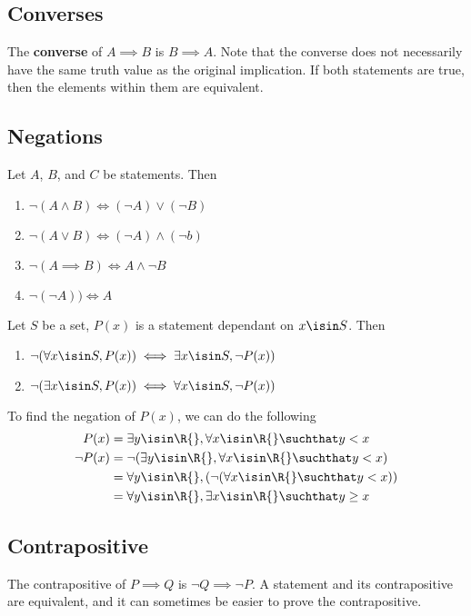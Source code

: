 \documentclass[12pt]{article}
\begin{document}
\subsection*{Converses}
The {\bf converse} of $A \implies B$ is $B \implies A$. Note that the converse does not necessarily have the same truth value as the original implication. If both statements are true, then the elements within them are equivalent.

\subsection*{Negations}
Let $A$, $B$, and $C$ be statements. Then
\begin{enumerate}
\item $\neg (A \land B) \iff (\neg A) \lor (\neg B)$
\item $\neg (A \lor B) \iff (\neg A) \land (\neg b)$
\item $\neg (A \implies B) \iff A \land \neg B$
\item $\neg (\neg A)) \iff A$
\end{enumerate}

Let $S$ be a set, $P(x)$ is a statement dependant on $x \isin S$. Then
\begin{enumerate}
\item $\neg (\forall x \isin S, P(x)) \iff \exists x \isin S, \neg P(x))$
\item $\neg (\exists x \isin S, P(x)) \iff \forall x \isin S, \neg P(x))$
\end{enumerate}

To find the negation of $P(x)$, we can do the following
\begin{align*}
P(x) &= \exists y \isin \R{}, \forall x \isin \R{} \suchthat y < x\\
\neg P(x) &= \neg (\exists y \isin \R{}, \forall x \isin \R{} \suchthat y < x)\\
&= \forall y \isin \R{}, (\neg (\forall x \isin \R{} \suchthat y < x))\\
&= \forall y \isin \R{}, \exists x \isin \R{} \suchthat y \geq x
\end{align*}

\subsection*{Contrapositive}
 The contrapositive of $P \implies Q$ is $\neg Q \implies \neg P$. A statement and its contrapositive are equivalent, and it can sometimes be easier to prove the contrapositive.
\end{document}
